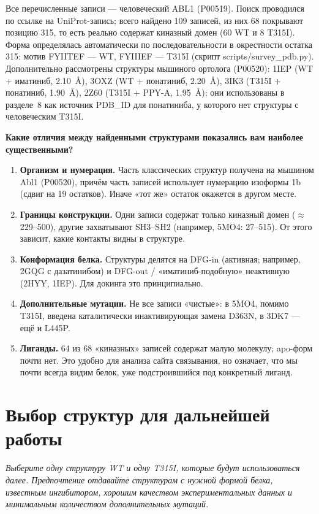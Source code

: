\documentclass[11pt,a4paper]{article}
\newcommand{\code}[1]{{\ttfamily #1}}
\newcommand{\instr}[1]{{\small\itshape #1\par}}
\begin{document}
Все перечисленные записи --- человеческий ABL1 (\code{P00519}). Поиск проводился по
ссылке на UniProt-запись; всего найдено 109 записей, из них 68 покрывают позицию 315,
то есть реально содержат киназный домен (60 WT и 8 T315I). Форма определялась
автоматически по последовательности в окрестности остатка 315: мотив \code{FYIITEF} ---
WT, \code{FYIIIEF} --- T315I (скрипт \code{scripts/survey\_pdb.py}). Дополнительно
рассмотрены структуры мышиного ортолога (\code{P00520}): \code{1IEP} (WT + иматиниб,
2.10~\AA), \code{3OXZ} (WT + понатиниб, 2.20~\AA), \code{3IK3} (T315I + понатиниб,
1.90~\AA), \code{2Z60} (T315I + PPY-A, 1.95~\AA); они использованы в разделе~8 как
источник PDB\_ID для понатиниба, у которого нет структуры с человеческим T315I.

\textbf{Какие отличия между найденными структурами показались вам наиболее
существенными?}

\begin{enumerate}[leftmargin=*,topsep=2pt,itemsep=2pt]
\item \textbf{Организм и нумерация.} Часть классических структур получена на мышином
Abl1 (\code{P00520}), причём часть записей использует нумерацию изоформы 1b (сдвиг на
19 остатков). Иначе «тот же» остаток окажется в другом месте.
\item \textbf{Границы конструкции.} Одни записи содержат только киназный домен
($\approx$229--500), другие захватывают SH3--SH2 (например, \code{5MO4}: 27--515).
От этого зависит, какие контакты видны в структуре.
\item \textbf{Конформация белка.} Структуры делятся на DFG-in (активная; например,
\code{2GQG} с дазатинибом) и DFG-out / «иматиниб-подобную» неактивную (\code{2HYY},
\code{1IEP}). Для докинга это принципиально.
\item \textbf{Дополнительные мутации.} Не все записи «чистые»: в \code{5MO4}, помимо
T315I, введена каталитически инактивирующая замена D363N, в \code{3DK7} --- ещё и L445P.
\item \textbf{Лиганды.} 64 из 68 «киназных» записей содержат малую молекулу; apo-форм
почти нет. Это удобно для анализа сайта связывания, но означает, что мы почти всегда
видим белок, уже подстроившийся под конкретный лиганд.
\end{enumerate}

\section{Выбор структур для дальнейшей работы}
\instr{Выберите одну структуру WT и одну T315I, которые будут использоваться далее.
Предпочтение отдавайте структурам с нужной формой белка, известным ингибитором, хорошим
качеством экспериментальных данных и минимальным количеством дополнительных мутаций.}
\end{document}
